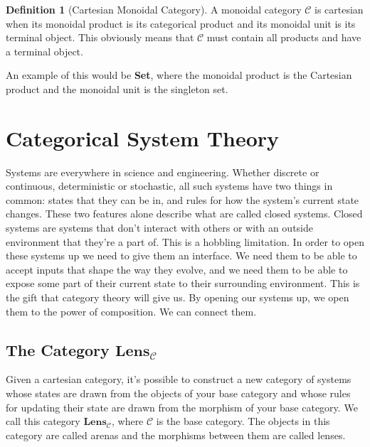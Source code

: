 \documentclass[12pt]{article}
\theoremstyle{definition}
\newtheorem{definition}{Definition}
\begin{document}
\begin{definition}[Cartesian Monoidal Category]
    A monoidal category $\mathcal{C}$ is cartesian when its monoidal product is its categorical product and its monoidal unit is its terminal object.
    This obviously means that $\mathcal{C}$ must contain all products and have a terminal object.
\end{definition}
An example of this would be \textbf{Set}, where the monoidal product is the Cartesian product and the monoidal unit is the singleton set.






\pagebreak
\section*{Categorical System Theory}
Systems are everywhere in science and engineering.
Whether discrete or continuous, deterministic or stochastic, all such systems have two things in common: states that they can be in, and rules for how the system's current state changes.
These two features alone describe what are called closed systems.
Closed systems are systems that don't interact with others or with an outside environment that they're a part of.
This is a hobbling limitation.
In order to open these systems up we need to give them an interface.
We need them to be able to accept inputs that shape the way they evolve, and we need them to be able to expose some part of their current state to their surrounding environment.
This is the gift that category theory will give us.
By opening our systems up, we open them to the power of composition.
We can connect them.
\subsection*{The Category $\textbf{Lens}_{\mathcal{C}}$}
Given a cartesian category, it's possible to construct a new category of systems whose states are drawn from the objects of your base category and whose rules for updating their state are drawn from the morphism of your base category.
We call this category $\textbf{Lens}_{\mathcal{C}}$, where $\mathcal{C}$ is the base category.
The objects in this category are called arenas and the morphisms between them are called lenses.
\end{document}
